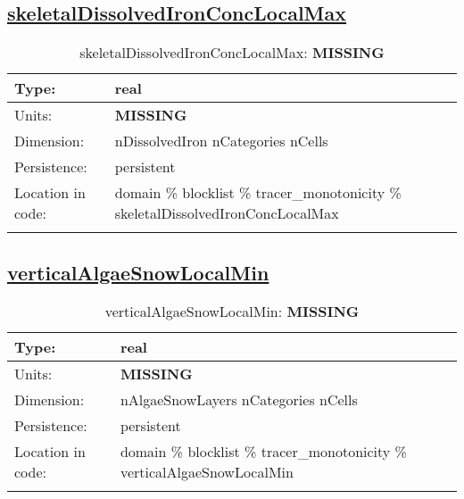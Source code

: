 \subsection[skeletalDissolvedIronConcLocalMax]{\hyperref[sec:var_tab_tracer_monotonicity]{skeletalDissolvedIronConcLocalMax}}
\label{subsec:var_sec_tracer_monotonicity_skeletalDissolvedIronConcLocalMax}
\begin{center}
\begin{longtable}{| p{2.0in} | p{4.0in} |}
        \hline 
        Type: & real \\
        \hline 
        Units: & {\bf \color{red} MISSING} \\
        \hline 
        Dimension: & nDissolvedIron nCategories nCells \\
        \hline 
        Persistence: & persistent \\
        \hline 
         Location in code: & domain \% blocklist \% tracer\_monotonicity \% skeletalDissolvedIronConcLocalMax \\
         \hline 
    \caption{skeletalDissolvedIronConcLocalMax: {\bf \color{red} MISSING}}
\end{longtable}
\end{center}
\subsection[verticalAlgaeSnowLocalMin]{\hyperref[sec:var_tab_tracer_monotonicity]{verticalAlgaeSnowLocalMin}}
\label{subsec:var_sec_tracer_monotonicity_verticalAlgaeSnowLocalMin}
\begin{center}
\begin{longtable}{| p{2.0in} | p{4.0in} |}
        \hline 
        Type: & real \\
        \hline 
        Units: & {\bf \color{red} MISSING} \\
        \hline 
        Dimension: & nAlgaeSnowLayers nCategories nCells \\
        \hline 
        Persistence: & persistent \\
        \hline 
         Location in code: & domain \% blocklist \% tracer\_monotonicity \% verticalAlgaeSnowLocalMin \\
         \hline 
    \caption{verticalAlgaeSnowLocalMin: {\bf \color{red} MISSING}}
\end{longtable}
\end{center}
